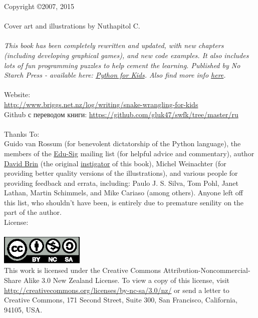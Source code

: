 Copyright \copyright 2007, 2015\\
\\
Cover art and illustrations by Nuthapitol C.\\
\\
\noindent
\textsf{\emph{This book has been completely rewritten and updated, with new chapters (including developing graphical games), and new code examples. It also includes lots of fun programming puzzles to help cement the learning. Published by No Starch Press - available here: \href{http://nostarch.com/pythonforkids}{Python for Kids}. Also find more info \href{http://jasonrbriggs.com/python-for-kids/}{here}.}}
\\
\\
\linebreak
\noindent
Website:\\ \href{http://www.briggs.net.nz/log/writing/snake-wrangling-for-kids}{http://www.briggs.net.nz/log/writing/snake-wrangling-for-kids}\\
Github с переводом книги: \url{https://github.com/gluk47/swfk/tree/master/ru}\\
\\
\noindent
Thanks To:\\
Guido van Rossum (for benevolent dictatorship of the Python language), the members of the \href{http://www.python.org/community/sigs/current/edu-sig/}{Edu-Sig} mailing list (for helpful advice and commentary), author \href{http://www.davidbrin.com/}{David Brin} (the original \href{http://www.salon.com/tech/feature/2006/09/14/basic/}{instigator} of this book), Michel Weinachter (for providing better quality versions of the illustrations), and various people for providing feedback and errata, including: Paulo J. S. Silva, Tom Pohl, Janet Lathan, Martin Schimmels, and Mike Cariaso (among others).  Anyone left off this list, who shouldn't have been, is entirely due to premature senility on the part of the author.\\

\noindent
License:\\
\\
\includegraphics[width=40mm]{../en/by-nc-sa.eps}\\
This work is licensed under the Creative Commons Attribution-Noncommercial-Share Alike 3.0 New Zealand License. To view a copy of this license, visit\\ \href{http://creativecommons.org/licenses/by-nc-sa/3.0/nz/}{http://creativecommons.org/licenses/by-nc-sa/3.0/nz/} or send a letter to Creative Commons, 171 Second Street, Suite 300, San Francisco, California, 94105, USA.\\

